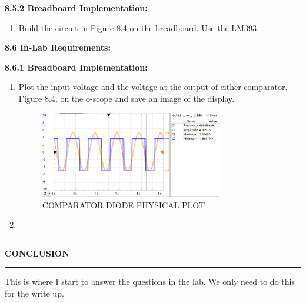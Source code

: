 \documentclass{article}
\begin{document}
\textbf{8.5.2 Breadboard Implementation:}
\begin{enumerate}
    \item Build the circuit in Figure 8.4 on the breadboard. Use the LM393.
\end{enumerate}
\textbf{\large 8.6 In-Lab Requirements:}

\textbf{8.6.1 Breadboard Implementation:}
\begin{enumerate}
    \item Plot the input voltage and the voltage at the output of either comparator,
Figure 8.4, on the o-scope and save an image of the display.
    \begin{figure}[H]
        \centering
        \includegraphics[width=0.75\textwidth]{inlab_1.png}
        \caption{COMPARATOR DIODE PHYSICAL PLOT} 
        \label{fig:comp-plot-op-amp-real}
    \end{figure}
    \item 

\end{enumerate}
\pagebreak
\begin{center}
    \hrule
    \vspace{0.2cm}
    \textbf{\large CONCLUSION}
    \vspace{0.2cm}
    \hrule
\end{center}

This is where I start to answer the questions in the lab. We only need to do this for the write up.
\end{document}
